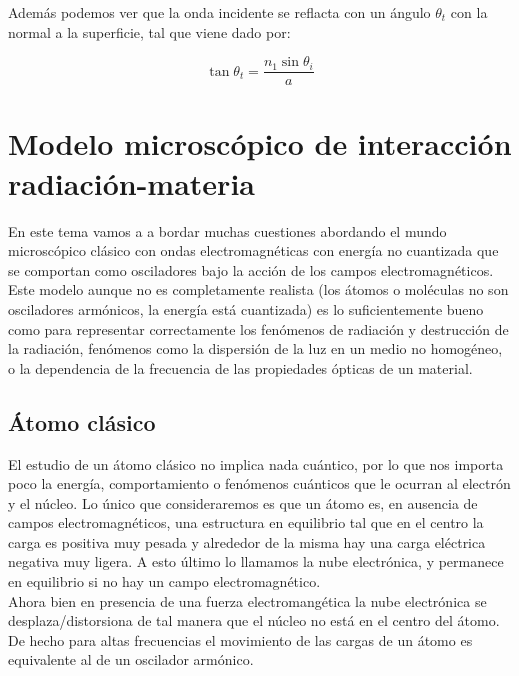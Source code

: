 \documentclass[12pt,a4paper]{article}
\numberwithin{equation}{section}
\numberwithin{figure}{section}
\begin{document}
Además podemos ver que la onda incidente se reflacta con un ángulo $\theta_t$ con la normal a la superficie, tal que viene dado por:

\begin{equation}
\tan \theta_t = \dfrac{n_1 \sin \theta_i}{a}
\end{equation}

\newpage

\section{Modelo microscópico de interacción radiación-materia}

En este tema vamos a a bordar muchas cuestiones abordando el mundo microscópico clásico con ondas electromagnéticas con energía no cuantizada que se comportan como osciladores bajo la acción de los campos electromagnéticos. Este modelo aunque no es completamente realista (los átomos o moléculas no son osciladores armónicos, la energía está cuantizada) es lo suficientemente bueno como para representar correctamente los fenómenos  de radiación y destrucción de la radiación, fenómenos como la dispersión de la luz en un medio no homogéneo, o la dependencia de la frecuencia de las propiedades ópticas de un material. \\

\subsection{Átomo clásico}

El estudio de un átomo clásico no implica nada cuántico, por lo que nos importa poco la energía, comportamiento o fenómenos cuánticos que le ocurran al electrón y el núcleo. Lo único que consideraremos es que un átomo es, en ausencia de campos electromagnéticos, una estructura en equilibrio tal que en el centro la carga es positiva muy pesada y alrededor de la misma hay una carga eléctrica negativa muy ligera. A esto último lo llamamos la nube electrónica, y permanece en equilibrio si no hay un campo electromagnético. \\

Ahora bien en presencia de una fuerza electromangética la nube electrónica se desplaza/distorsiona de tal manera que el núcleo no está en el centro del átomo. De hecho para altas frecuencias el movimiento de las cargas de un átomo es equivalente al de un oscilador armónico. \\
\end{document}
